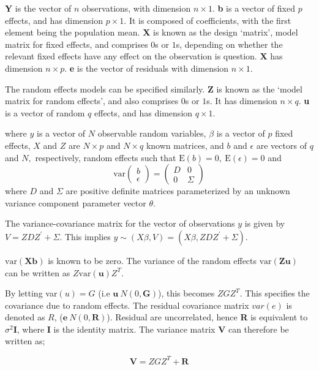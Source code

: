 \documentclass[12pt, a4paper]{report}
\theoremstyle{plain}
\theoremstyle{definition}
\theoremstyle{remark}
\begin{document}
\textbf{Y} is the vector of $n$ observations, with dimension $n
\times 1$. \textbf{b} is a vector of fixed $p$ effects, and has
dimension $p \times 1$. It is composed of coefficients, with the
first element being the population mean.  \textbf{X} is known as
the design `matrix', model matrix for fixed effects, and comprises
$0$s or $1$s, depending on whether the relevant fixed effects have
any effect on the observation is question. \textbf{X} has
dimension $n \times p$. \textbf{e} is the vector of residuals with
dimension $n \times 1$.

The random effects models can be specified similarly. \textbf{Z}
is known as the `model matrix for random effects', and also
comprises $0$s or $1$s. It has dimension $n \times q$. \textbf{u
}is a vector of random $q$ effects, and has dimension $q \times
1$.


where $y$ is a vector of $N$ observable random variables, $\beta$ is a vector of $p$ fixed effects, $X$ and $Z$ are $N \times p$ and $N \times q$ known matrices, and $b$ and $\epsilon$  are vectors of $q$ and $N,$ respectively, random effects such that $\mathrm{E}(b)=0, \ \mathrm{E}(\epsilon)=0$
and
\[
	\mathrm{var} \begin{pmatrix}
			b \\
		\epsilon \end{pmatrix}  =
	\begin{pmatrix}
		D & 0 \\
		0 & \Sigma \end{pmatrix} \]
where $D$ and $\Sigma$ are positive definite matrices parameterized by an unknown variance component parameter vector $ \theta.$ 

The variance-covariance matrix for the vector of observations $y$ is given by $V = ZDZ^{\prime}+ \Sigma.$ This implies $y \sim(X\beta, V) = (X\beta,ZDZ^{\prime}+ \Sigma)$. 

$\mbox{var}(\textbf{Xb})$ is known to be zero. The variance of the
random effects $\mbox{var}(\textbf{Zu})$ can be written as
$Z\mbox{var}(\textbf{u})Z^{T}$.

By letting var$(u) = G$ (i.e $\textbf{u} ~ N(0,\textbf{G})$), this
becomes $ZGZ^{T}$. This specifies the covariance due to random
effects. The residual covariance matrix $var(e)$ is denoted as
$R$, ($\textbf{e} ~ N(0,\textbf{R})$). Residual are uncorrelated,
hence \textbf{R} is equivalent to $\sigma^{2}$\textbf{I}, where
\textbf{I} is the identity matrix. The variance matrix \textbf{V}
can therefore be written as;

\begin{equation}
\textbf{V}  = ZGZ^{T} + \textbf{R}
\end{equation}
\end{document}
